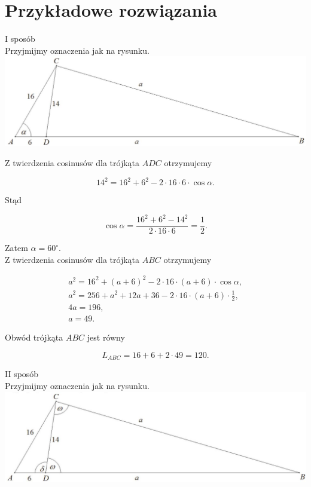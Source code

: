 \documentclass[10pt]{article}
\begin{document}
\section*{Przykładowe rozwiązania}
I sposób\\
Przyjmijmy oznaczenia jak na rysunku.\\
\includegraphics[max width=\textwidth, center]{2025_02_07_d712b9a47aa2c64928dbg-24(1)}

Z twierdzenia cosinusów dla trójkąta $A D C$ otrzymujemy

$$
14^{2}=16^{2}+6^{2}-2 \cdot 16 \cdot 6 \cdot \cos \alpha .
$$

Stąd

$$
\cos \alpha=\frac{16^{2}+6^{2}-14^{2}}{2 \cdot 16 \cdot 6}=\frac{1}{2} .
$$

Zatem $\alpha=60^{\circ}$.\\
Z twierdzenia cosinusów dla trójkąta $A B C$ otrzymujemy

$$
\begin{gathered}
a^{2}=16^{2}+(a+6)^{2}-2 \cdot 16 \cdot(a+6) \cdot \cos \alpha, \\
a^{2}=256+a^{2}+12 a+36-2 \cdot 16 \cdot(a+6) \cdot \frac{1}{2}, \\
4 a=196, \\
a=49 .
\end{gathered}
$$

Obwód trójkąta $A B C$ jest równy

$$
L_{A B C}=16+6+2 \cdot 49=120 .
$$

II sposób\\
Przyjmijmy oznaczenia jak na rysunku.\\
\includegraphics[max width=\textwidth, center]{2025_02_07_d712b9a47aa2c64928dbg-24}
\end{document}
